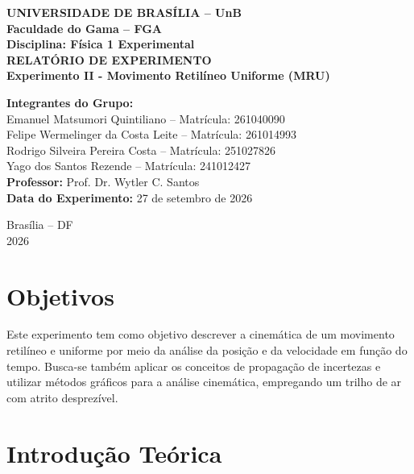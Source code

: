 \documentclass[12pt, a4paper]{article}
\begin{document}
\begin{center}
    \textbf{\Large UNIVERSIDADE DE BRASÍLIA -- UnB}\\
    \textbf{\large Faculdade do Gama -- FGA}\\
    \vspace{0.5cm}
    \textbf{\large Disciplina: Física 1 Experimental}\\
    \vspace{1.5cm}
    {\Large \textbf{RELATÓRIO DE EXPERIMENTO}}\\
    {\large \textbf{Experimento II - Movimento Retilíneo Uniforme (MRU)}}\\
    \vspace{1.5cm}
\end{center}

\begin{flushright}
    \textbf{Integrantes do Grupo:}\\
    Emanuel Matsumori Quintiliano -- Matrícula: 261040090\\
    Felipe Wermelinger da Costa Leite -- Matrícula: 261014993\\
    Rodrigo Silveira Pereira Costa -- Matrícula: 251027826\\
    Yago dos Santos Rezende -- Matrícula: 241012427\\
    \vspace{0.5cm}
    \textbf{Professor:} Prof. Dr. Wytler C. Santos\\
    \textbf{Data do Experimento:} 27 de setembro de 2026
\end{flushright}

\vfill
\begin{center}
    Brasília -- DF \\
    2026
\end{center}

\newpage

\section{Objetivos}
Este experimento tem como objetivo descrever a cinemática de um movimento retilíneo e uniforme por meio da análise da posição e da velocidade em função do tempo. Busca-se também aplicar os conceitos de propagação de incertezas e utilizar métodos gráficos para a análise cinemática, empregando um trilho de ar com atrito desprezível.

\section{Introdução Teórica}
\end{document}
